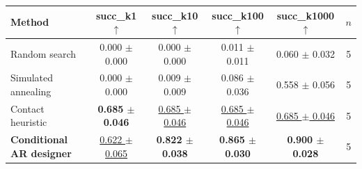 \begin{tabular}{lccccc}
\toprule
Method & succ\_k1 $\uparrow$ & succ\_k10 $\uparrow$ & succ\_k100 $\uparrow$ & succ\_k1000 $\uparrow$ & $n$ \\
\midrule
Random search & 0.000 $\pm$ 0.000 & 0.000 $\pm$ 0.000 & 0.011 $\pm$ 0.011 & 0.060 $\pm$ 0.032 & 5 \\
Simulated annealing & 0.000 $\pm$ 0.000 & 0.009 $\pm$ 0.009 & 0.086 $\pm$ 0.036 & 0.558 $\pm$ 0.056 & 5 \\
Contact heuristic & \textbf{0.685 $\pm$ 0.046} & \underline{0.685 $\pm$ 0.046} & \underline{0.685 $\pm$ 0.046} & \underline{0.685 $\pm$ 0.046} & 5 \\
\textbf{Conditional AR designer} & \underline{0.622 $\pm$ 0.065} & \textbf{0.822 $\pm$ 0.038} & \textbf{0.865 $\pm$ 0.030} & \textbf{0.900 $\pm$ 0.028} & 5 \\
\bottomrule
\end{tabular}
